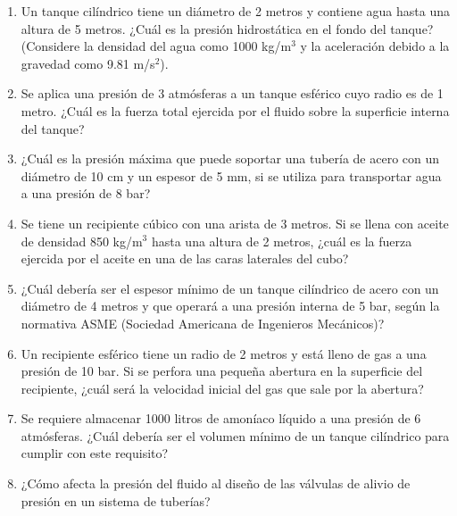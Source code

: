 \documentclass[../main]{subfiles}
\begin{document}
\begin{enumerate}
    \item Un tanque cilíndrico tiene un diámetro de 2 metros y contiene agua hasta una altura de 5 metros. ¿Cuál es la presión hidrostática en el fondo del tanque? (Considere la densidad del agua como 1000 kg/m$^3$ y la aceleración debido a la gravedad como 9.81 m/s$^2$).
    \item Se aplica una presión de 3 atmósferas a un tanque esférico cuyo radio es de 1 metro. ¿Cuál es la fuerza total ejercida por el fluido sobre la superficie interna del tanque?
    \item ¿Cuál es la presión máxima que puede soportar una tubería de acero con un diámetro de 10 cm y un espesor de 5 mm, si se utiliza para transportar agua a una presión de 8 bar?
    \item Se tiene un recipiente cúbico con una arista de 3 metros. Si se llena con aceite de densidad 850 kg/m$^3$ hasta una altura de 2 metros, ¿cuál es la fuerza ejercida por el aceite en una de las caras laterales del cubo?
    \item ¿Cuál debería ser el espesor mínimo de un tanque cilíndrico de acero con un diámetro de 4 metros y que operará a una presión interna de 5 bar, según la normativa ASME (Sociedad Americana de Ingenieros Mecánicos)?
    \item Un recipiente esférico tiene un radio de 2 metros y está lleno de gas a una presión de 10 bar. Si se perfora una pequeña abertura en la superficie del recipiente, ¿cuál será la velocidad inicial del gas que sale por la abertura?
    \item Se requiere almacenar 1000 litros de amoníaco líquido a una presión de 6 atmósferas. ¿Cuál debería ser el volumen mínimo de un tanque cilíndrico para cumplir con este requisito?
    \item ¿Cómo afecta la presión del fluido al diseño de las válvulas de alivio de presión en un sistema de tuberías?
    \end{enumerate}
 
\end{document}
